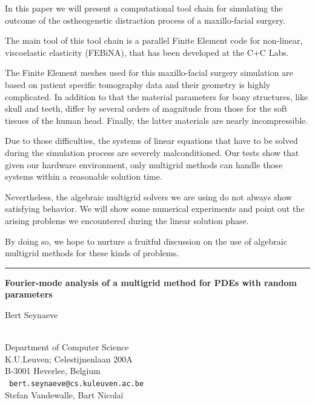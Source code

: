\documentclass[twosided]{report}
\begin{document}
In this paper we will present a computational tool chain for simulating
the outcome of the ostheogenetic distraction process of a
maxillo-facial surgery.

The main tool of this tool chain is a parallel Finite Element code for
non-linear, viscoelastic elasticity (FEBiNA), that has been developed
at the C+C Labs.

The Finite Element meshes used for this maxillo-facial surgery
simulation are based on patient specific tomography data and their
geometry is highly complicated. In addition to that the material
parameters for bony structures, like skull and teeth, differ by several
orders of magnitude from those for the soft tissues of the human head.
Finally, the latter materials are nearly incompressible.

Due to those difficulties, the systems of linear equations that have to
be solved during the simulation process are severely malconditioned.
Our tests show that given our hardware environment, only multigrid
methods can handle those systems within a reasonable solution time.

Nevertheless, the algebraic multigrid solvers we are using do not
always show satisfying behavior. We will show some numerical
experiments and point out the arising problems we encountered during
the linear solution phase.

By doing so, we hope to nurture a fruitful discussion on the use of
algebraic multigrid methods for these kinds of problems.

\begin{center}

\rule{6in}{1pt}
\end{center}

\begin{center}
{\large			\label{seynaeve}
{\bf
Fourier-mode analysis of a multigrid method for PDEs with random
parameters}

Bert Seynaeve} \\
Department of Computer Science \\
K.U.Leuven; Celestijnenlaan 200A \\
B-3001 Heverlee, Belgium
\\ {\tt
bert.seynaeve@cs.kuleuven.ac.be
}
\\
Stefan Vandewalle,
Bart Nicola\"{i}
\end{center}
\end{document}
